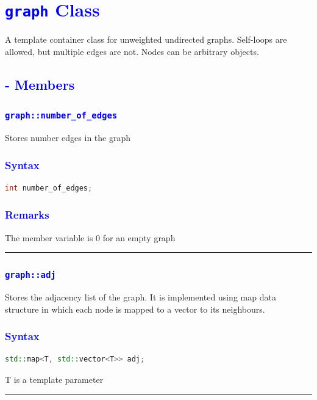 \documentclass[11pt,a4paper]{article}
\begin{document}
\section*{\textcolor{blue}{{\huge \texttt{graph} Class}} }
A template container class for unweighted undirected graphs. Self-loops are allowed, but multiple edges are not. Nodes can be arbitrary objects.

\subsection*{\textcolor{blue}{{\LARGE - Members}}}
\subsubsection*{\textcolor{blue}{ \Large \texttt{graph::number\_of\_edges}}}
Stores number edges in the graph
\subsubsection*{\textcolor{blue}{ \large{Syntax}}}
\begin{lstlisting}[language=C++]
 int number_of_edges;
\end{lstlisting}
\subsubsection*{\textcolor{blue}{ \large{Remarks}}}
The member variable is 0 for an empty graph

\rule{17cm}{0.1mm}



\subsubsection*{\textcolor{blue}{ \Large \texttt{graph::adj}}}
Stores the adjacency list of the graph. It is implemented using map data structure in which each node is mapped to a vector to its neighbours.

\subsubsection*{\textcolor{blue}{ \large {Syntax}}}
\begin{lstlisting}[language=C++]
 std::map<T, std::vector<T>> adj;
\end{lstlisting}
T is a template parameter
\\
\rule{17cm}{0.1mm}
\end{document}
